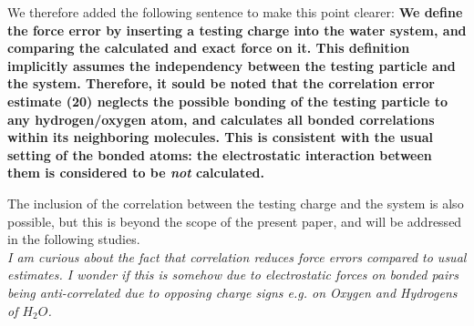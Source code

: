 \documentclass[a4paper]{article}
\begin{document}
We therefore added the following sentence to make this point clearer:
\textbf{
  We define the force error by inserting a
testing charge into the water system, and comparing the
calculated and exact force on it. This definition implicitly assumes
the independency between the testing particle and the
system. Therefore, it sould be noted that the correlation error
estimate (20)
neglects the possible bonding
of the testing particle to any hydrogen/oxygen atom, and
calculates all bonded correlations
within its {neighboring} molecules. This is consistent
with the usual setting of the bonded atoms: the electrostatic interaction
between them is considered to be \emph{not} calculated.}

The inclusion of the correlation between the testing
charge and the system is also possible, but this is beyond the scope
of the present paper, and will be addressed in the following studies.\\





\textit{
I am curious about the fact that correlation reduces force errors
compared to usual estimates. I wonder if this is somehow due to
electrostatic forces on bonded pairs being anti-correlated due to
opposing charge signs e.g. on Oxygen and Hydrogens of $H_2O$.
}
\end{document}
